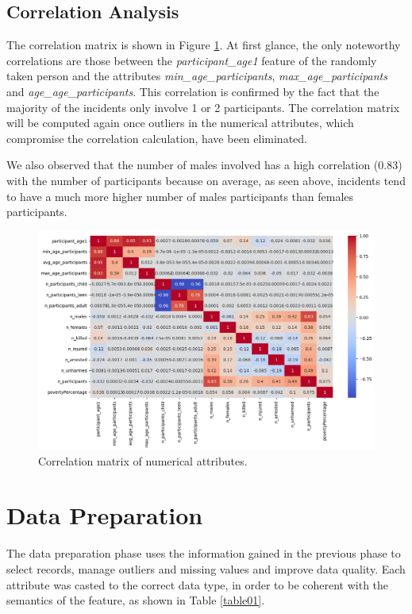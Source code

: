 \documentclass[10pt,a4paper]{report}
\begin{document}
\section{Correlation Analysis}

The correlation matrix is shown in Figure \ref{corr_matrix_du}.
At first glance, the only noteworthy correlations are those between the \textit{participant\_age1} feature of the randomly taken person and the attributes \textit{min\_age\_participants}, \textit{max\_age\_participants} and \textit{age\_age\_participants}.
This correlation is confirmed by the fact that the majority of the incidents only involve 1 or 2 participants. 
The correlation matrix will be computed again once outliers in the numerical attributes, which compromise the correlation calculation, have been eliminated.

We also observed that the number of males involved has a high correlation (0.83) with the number of participants because on average, as seen above, incidents tend to have a much more higher number of males participants than females participants.

\begin{figure}[h]
	\includegraphics[width=1\textwidth]{corr_matrix_du}
	\centering
	\caption{Correlation matrix of numerical attributes.}
	\label{corr_matrix_du}
\end{figure}

\chapter{Data Preparation}

The data preparation phase uses the information gained in the previous phase to select records, manage outliers and missing values and improve data quality.
Each attribute was casted to the correct data type, in order to be coherent with the semantics of the feature, as shown in Table \ref{table01}.
\end{document}
